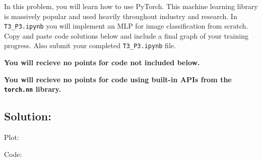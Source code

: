 \documentclass[submit]{harvardml}
\begin{document}
\newpage

\begin{problem}
  In this problem, you will learn how to use PyTorch. This machine learning library is massively popular and used heavily throughout industry and research. In \verb|T3_P3.ipynb| you will implement an MLP for image classification from scratch. Copy and paste code solutions below and include a final graph of your training progress. Also submit your completed \verb|T3_P3.ipynb| file.

  {\bfseries You will recieve no points for code not included below.}

  {\bfseries You will recieve no points for code using built-in APIs from the \verb|torch.nn| library.}
  
\end{problem}


\subsection*{Solution:}
Plot:


Code:
\end{document}
